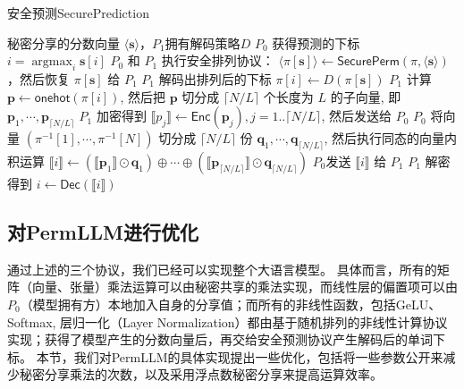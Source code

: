 \begin{algorithm}[h]
    \caption{安全预测\textsf{SecurePrediction}}
    \label{alg:perm-llm:prediction}
    \begin{algorithmic}[1]
    \Require 秘密分享的分数向量 $\langle \mathbf s \rangle$，$P_1$拥有解码策略$D$
    \Ensure $P_0$ 获得预测的下标 $i = \mathop{\text{argmax}}_i \mathbf s[i]$
    \State $P_0$ 和 $P_1$ 执行安全排列协议： $\langle \pi[\mathbf s] \rangle \gets \mathsf{SecurePerm}(\pi, \langle \mathbf s \rangle)$，然后恢复 $\pi[\mathbf s]$ 给 $P_1$
    \State $P_1$ 解码出排列后的下标 $\pi[i] \gets D(\pi[\mathbf s])$
    \State $P_1$ 计算 $\mathbf p \gets \mathsf{onehot}(\pi[i])$, 然后把 $\mathbf p$ 切分成 $\lceil N/L \rceil$ 个长度为 $L$ 的子向量, 即 $\mathbf p_1, \cdots, \mathbf p_{\lceil N/L \rceil}$
    \State $P_1$ 加密得到 $\llbracket p_j \rrbracket \gets \mathsf{Enc}(\mathbf p_j), j  = 1..{\lceil N/L \rceil}$, 然后发送给 $P_0$
    \State $P_0$ 将向量 $(\pi^{-1}[1], \cdots, \pi^{-1}[N])$ 切分成 $\lceil N/L \rceil$ 份 $\mathbf q_1, \cdots, \mathbf q_{\lceil N/L \rceil}$, 然后执行同态的向量内积运算 $\llbracket i \rrbracket \gets (\llbracket \mathbf p_1 \rrbracket \odot \mathbf q_1) \oplus \cdots \oplus (\llbracket \mathbf p_{\lceil N/L \rceil} \rrbracket \odot \mathbf q_{\lceil N/L \rceil})$
    $P_0$发送 $\llbracket i \rrbracket$ 给 $P_1$
    \State $P_1$ 解密得到 $i \gets \mathsf{Dec}(\llbracket i \rrbracket)$
\end{algorithmic}
\end{algorithm}


\subsection{对PermLLM进行优化}
通过上述的三个协议，我们已经可以实现整个大语言模型。
%
具体而言，所有的矩阵（向量、张量）乘法运算可以由秘密共享的乘法实现，而线性层的偏置项可以由$P_0$（模型拥有方）本地加入自身的分享值；而所有的非线性函数，包括GeLU、Softmax, 层归一化（Layer Normalization）都由基于随机排列的非线性计算协议实现；获得了模型产生的分数向量后，再交给安全预测协议产生解码后的单词下标。
%
本节，我们对PermLLM的具体实现提出一些优化，包括将一些参数公开来减少秘密分享乘法的次数，以及采用浮点数秘密分享来提高运算效率。
%
